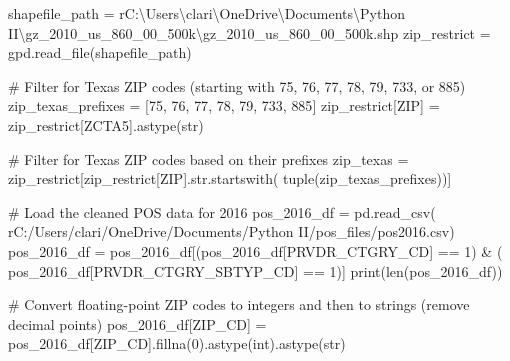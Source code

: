 \documentclass[
  letterpaper,
  DIV=11,
  numbers=noendperiod]{scrartcl}
\newenvironment{Shaded}{\begin{snugshade}}{\end{snugshade}}
\newcommand{\BuiltInTok}[1]{\textcolor[rgb]{0.00,0.23,0.31}{#1}}
\newcommand{\CommentTok}[1]{\textcolor[rgb]{0.37,0.37,0.37}{#1}}
\newcommand{\DecValTok}[1]{\textcolor[rgb]{0.68,0.00,0.00}{#1}}
\newcommand{\NormalTok}[1]{\textcolor[rgb]{0.00,0.23,0.31}{#1}}
\newcommand{\OperatorTok}[1]{\textcolor[rgb]{0.37,0.37,0.37}{#1}}
\newcommand{\StringTok}[1]{\textcolor[rgb]{0.13,0.47,0.30}{#1}}
\newcommand{\VerbatimStringTok}[1]{\textcolor[rgb]{0.13,0.47,0.30}{#1}}
\begin{document}
\begin{Shaded}
\begin{Highlighting}[]
\NormalTok{shapefile\_path }\OperatorTok{=} \VerbatimStringTok{r\textquotesingle{}C:\textbackslash{}Users\textbackslash{}clari\textbackslash{}OneDrive\textbackslash{}Documents\textbackslash{}Python II\textbackslash{}gz\_2010\_us\_860\_00\_500k\textbackslash{}gz\_2010\_us\_860\_00\_500k.shp\textquotesingle{}}
\NormalTok{zip\_restrict }\OperatorTok{=}\NormalTok{ gpd.read\_file(shapefile\_path)}

\CommentTok{\# Filter for Texas ZIP codes (starting with 75, 76, 77, 78, 79, 733, or 885)}
\NormalTok{zip\_texas\_prefixes }\OperatorTok{=}\NormalTok{ [}\StringTok{\textquotesingle{}75\textquotesingle{}}\NormalTok{, }\StringTok{\textquotesingle{}76\textquotesingle{}}\NormalTok{, }\StringTok{\textquotesingle{}77\textquotesingle{}}\NormalTok{, }\StringTok{\textquotesingle{}78\textquotesingle{}}\NormalTok{, }\StringTok{\textquotesingle{}79\textquotesingle{}}\NormalTok{, }\StringTok{\textquotesingle{}733\textquotesingle{}}\NormalTok{, }\StringTok{\textquotesingle{}885\textquotesingle{}}\NormalTok{]}
\NormalTok{zip\_restrict[}\StringTok{\textquotesingle{}ZIP\textquotesingle{}}\NormalTok{] }\OperatorTok{=}\NormalTok{ zip\_restrict[}\StringTok{\textquotesingle{}ZCTA5\textquotesingle{}}\NormalTok{].astype(}\BuiltInTok{str}\NormalTok{)}

\CommentTok{\# Filter for Texas ZIP codes based on their prefixes}
\NormalTok{zip\_texas }\OperatorTok{=}\NormalTok{ zip\_restrict[zip\_restrict[}\StringTok{\textquotesingle{}ZIP\textquotesingle{}}\NormalTok{].}\BuiltInTok{str}\NormalTok{.startswith(}
    \BuiltInTok{tuple}\NormalTok{(zip\_texas\_prefixes))]}

\CommentTok{\# Load the cleaned POS data for 2016}
\NormalTok{pos\_2016\_df }\OperatorTok{=}\NormalTok{ pd.read\_csv(}
    \VerbatimStringTok{r\textquotesingle{}C:/Users/clari/OneDrive/Documents/Python II/pos\_files/pos2016.csv\textquotesingle{}}\NormalTok{)}
\NormalTok{pos\_2016\_df }\OperatorTok{=}\NormalTok{ pos\_2016\_df[(pos\_2016\_df[}\StringTok{\textquotesingle{}PRVDR\_CTGRY\_CD\textquotesingle{}}\NormalTok{] }\OperatorTok{==} \DecValTok{1}\NormalTok{) }\OperatorTok{\&}\NormalTok{ (}
\NormalTok{    pos\_2016\_df[}\StringTok{\textquotesingle{}PRVDR\_CTGRY\_SBTYP\_CD\textquotesingle{}}\NormalTok{] }\OperatorTok{==} \DecValTok{1}\NormalTok{)]}
\BuiltInTok{print}\NormalTok{(}\BuiltInTok{len}\NormalTok{(pos\_2016\_df))}

\CommentTok{\# Convert floating{-}point ZIP codes to integers and then to strings (remove decimal points)}
\NormalTok{pos\_2016\_df[}\StringTok{\textquotesingle{}ZIP\_CD\textquotesingle{}}\NormalTok{] }\OperatorTok{=}\NormalTok{ pos\_2016\_df[}\StringTok{\textquotesingle{}ZIP\_CD\textquotesingle{}}\NormalTok{].fillna(}\DecValTok{0}\NormalTok{).astype(}\BuiltInTok{int}\NormalTok{).astype(}\BuiltInTok{str}\NormalTok{)}


\end{Highlighting}
\end{Shaded}
\end{document}
